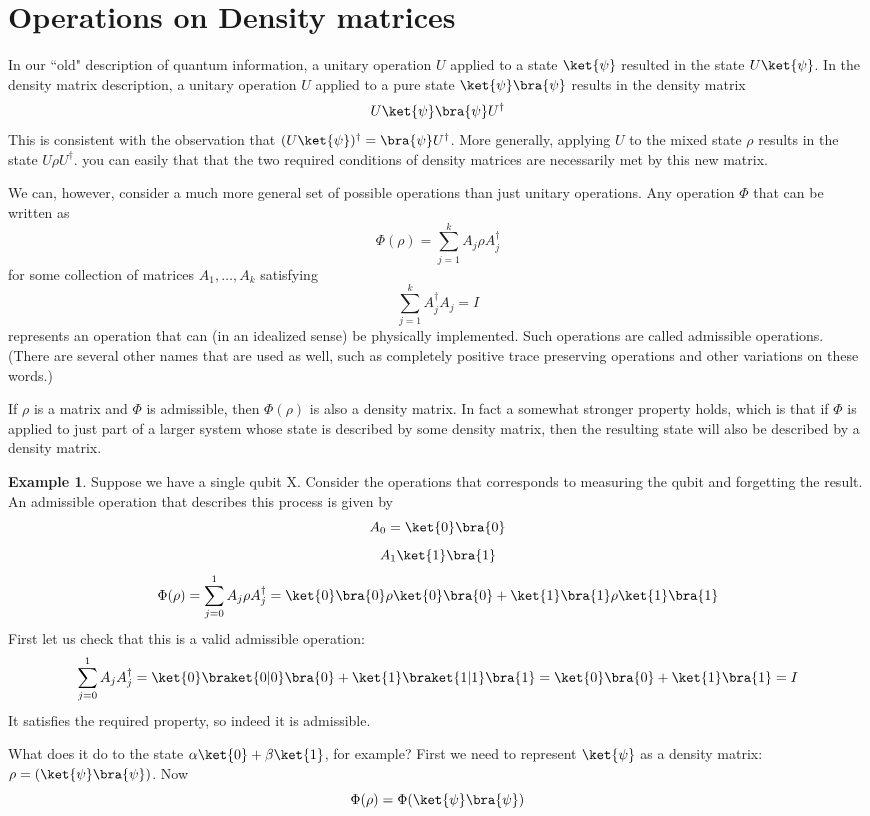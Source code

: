 \documentclass[12pt, oneside]{book}
\theoremstyle{definition}
\theoremstyle{definition}
\newtheorem{example}{Example}[section]
\theoremstyle{remark}
\begin{document}
\section{Operations on Density matrices}
In our ``old" description of quantum information, a unitary operation $U$ applied to a state $\ket{\psi}$ resulted in the state $U\ket{\psi}$. In the density matrix description, a unitary operation $U$ applied to a pure state $\ket{\psi}\bra{\psi}$ results in the density matrix
\[
U\ket{\psi} \bra{\psi}U^{\dagger}
\]
This is consistent with the observation that $(U\ket{\psi})^{\dagger}=\bra{\psi}U^{\dagger}$. More generally, applying $U$ to the mixed state $\rho$ results in the state $U\rho U^{\dagger}$. you can easily that that the two required conditions of density matrices are necessarily met by this new matrix.

We can, however, consider a much more general set of possible operations than just unitary operations. Any operation $\Phi$ that can be written as
\[
\Phi(\rho)=\sum_{j=1}^k A_j\rho A_j^{\dagger}
\]
for some collection of matrices $A_1,\ldots,A_k$ satisfying
\[
\sum_{j=1}^k A_j^{\dagger}A_j = I
\]
represents an operation that can (in an idealized sense) be physically implemented. Such operations are called admissible operations. (There are several other names that are used as well, such as completely positive trace preserving operations and other variations on these words.)

If $\rho$ is a matrix and $\Phi$ is admissible, then $\Phi(\rho)$ is also a density matrix. In fact a somewhat stronger property holds, which is that if $\Phi$ is applied to just part of a larger system whose state is described by some density matrix, then the resulting state will also be described by a density matrix.

\begin{example}
    Suppose we have a single qubit X. Consider the operations that corresponds to measuring the qubit and forgetting the result. An admissible operation that describes this process is given by
    \[
    A_0=\ket{0}\bra{0}
    \]
    \[
    A_1\ket{1}\bra{1}
    \]
    \[
    \Phi(\rho)=\sum_{j=0}^1 A_j\rho A_j^{\dagger} =\ket{0}\bra{0}\rho\ket{0}\bra{0} + \ket{1}\bra{1}\rho\ket{1}\bra{1}
    \]
    First let us check that this is a valid admissible operation:
    \[
    \sum_{j=0}^1 A_jA_j^{\dagger} =\ket{0}\braket{0|0}\bra{0} + \ket{1}\braket{1|1}\bra{1} = \ket{0}\bra{0}+\ket{1}\bra{1}=I
    \]
    It satisfies the required property, so indeed it is admissible. 

    What does it do to the state $\alpha\ket{0}+\beta\ket{1}$, for example? First we need to represent $\ket{\psi}$ as a density matrix: $\rho=(\ket{\psi}\bra{\psi})$. Now
    \[
    \Phi(\rho) =\Phi(\ket{\psi}\bra{\psi})
    \]
\end{example}
\end{document}
